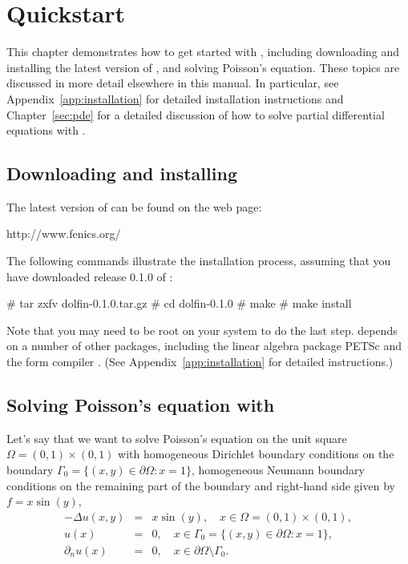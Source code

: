 \chapter{Quickstart}
\label{chap:quickstart}

This chapter demonstrates how to get started with \dolfin{}, including
downloading and installing the latest version of \dolfin{}, and solving
Poisson's equation. These topics are discussed in more detail
elsewhere in this manual. In particular, see
Appendix~\ref{app:installation} for detailed installation instructions
and Chapter~\ref{sec:pde} for a detailed discussion of how to solve
partial differential equations with \dolfin{}.

\section{Downloading and installing \dolfin{}}

The latest version of \dolfin{} can be found on the \fenics{} web page:
\begin{code}
  http://www.fenics.org/
\end{code}
The following commands illustrate the installation process, assuming
that you have downloaded release 0.1.0 of \dolfin{}:
\begin{code}
  # tar zxfv dolfin-0.1.0.tar.gz
  # cd dolfin-0.1.0
  # make
  # make install
\end{code}

Note that you may need to be root on your system to do the last
step. \dolfin{} depends on a number of other packages, including
the linear algebra package PETSc and the form compiler \ffc{}.
(See Appendix~\ref{app:installation} for detailed instructions.)

\section{Solving Poisson's equation with \dolfin{}}

Let's say that we want to solve Poisson's equation on the unit square
$\Omega = (0,1) \times (0,1)$ with homogeneous Dirichlet boundary
conditions on the boundary $\Gamma_0 = \{(x, y) \in \partial \Omega : x = 1\}$,
homogeneous Neumann boundary conditions on the remaining part of the boundary
and right-hand side given by $f = x \sin(y)$,
\begin{eqnarray} \label{eq:poisson,quickstart}
  - \Delta u(x, y) &=& x \sin(y), \quad
  x \in \Omega = (0,1) \times (0,1), \\
  u(x) &=& 0, \quad
  x \in \Gamma_0 = \{(x, y) \in \partial \Omega : x = 1\}, \\
  \partial_n u(x) &=& 0, \quad
  x \in \partial \Omega \setminus \Gamma_0.
\end{eqnarray}

